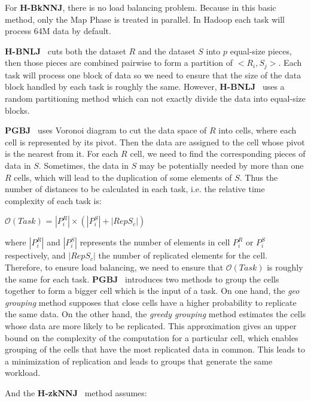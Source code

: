 \documentclass[10pt,journal,compsoc]{IEEEtran}
\newcommand{\Z}{{\bf H-zkNNJ}}
\newcommand{\VO}{{\bf PGBJ}}
\newcommand{\HBNLJ}{{\bf H-BNLJ}}
\newcommand{\HBK}{{\bf H-BkNNJ}}
\begin{document}
For \HBK, there is no load balancing problem. Because in this basic method, only the Map Phase is treated in parallel. In Hadoop each task will process 64M data by default.

\HBNLJ~ cuts both the dataset $R$ and the dataset $S$ into $p$ equal-size pieces, then those pieces are 
combined pairwise to form a partition of $<R_i, S_j>$. Each task will process one block of data 
so we need to ensure that the size of the data block handled by each task is roughly the 
same. However, \HBNLJ~ uses a random partitioning method which can not exactly divide 
the data into equal-size blocks. 

\VO~ uses Voronoi diagram to cut the data space of $R$ into cells, where each cell is represented 
by its pivot. Then the data are assigned to the cell whose pivot is the nearest from it. For each 
$R$ cell, we need to find the corresponding pieces of data in $S$. Sometimes, the data in $S$ may be 
potentially needed by more than one $R$ cells, which will lead to the duplication of some 
elements of $S$. Thus the number of distances to be calculated in each task, i.e. the relative time 
complexity of each task is:
\begin{center}
$\mathcal{O}\left(Task\right)$ = $\left|P_i^R\right| \times \left(\left|P_i^S\right| + \left|RepS_c\right| \right)$
\end{center}
where $\left|P_i^R\right|$ and $\left|P_i^S\right|$ represents the number of elements in cell $P_i^R$ or 
$P_i^S$ respectively, and $\left|RepS_c\right|$ the number of replicated elements for the cell. 
Therefore, to ensure load balancing, we need to ensure that $\mathcal{O}\left(Task\right)$ is roughly the 
same for each task.
\VO~ introduces two methods to group the cells together to form a bigger cell which is the 
input of a task. \label{pgbj_grouping}
On one hand, the \emph{geo grouping} method supposes that close cells have a higher probability to 
replicate the same data. On the other hand, 
the \emph{greedy grouping} method estimates the cells whose data are more likely to be replicated. This approximation gives an upper bound on 
the complexity of the computation for a particular cell, which enables grouping of the cells that have the most replicated data in 
common. This leads to a minimization of replication and leads to groups that generate the same workload. 

And the \Z~ method assumes:
\end{document}
